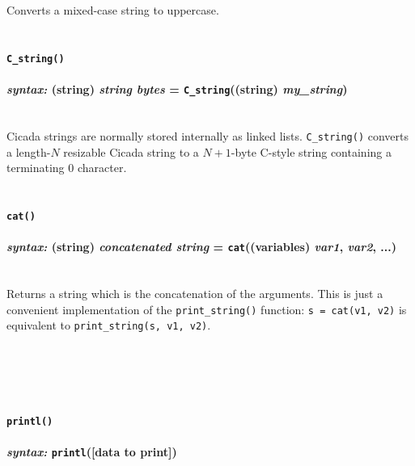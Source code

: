 \documentclass{article}
\begin{document}
Converts a mixed-case string to uppercase.\\\\


\paragraph{\texttt{C\_string()}\\\\
\normalfont \emph{syntax: } (string) \emph{string bytes} = \texttt{C\_string}((string) \emph{my\_string})\\\\}

Cicada strings are normally stored internally as linked lists.  \verb#C_string()# converts a length-$N$ resizable Cicada string to a $N+1$-byte C-style string containing a terminating 0 character.\\\\


\paragraph{\texttt{cat()}\\\\
\normalfont \emph{syntax: } (string) \emph{concatenated string} = \texttt{cat}((variables) \emph{var1}, \emph{var2}, ...)\\\\}

Returns a string which is the concatenation of the arguments.  This is just a convenient implementation of the \verb#print_string()# function:  \verb#s = cat(v1, v2)# is equivalent to \verb#print_string(s, v1, v2)#.\\\\\\\\



\\

\paragraph{\texttt{printl()}\\\\
\normalfont \emph{syntax: } \texttt{printl}([data to print])\\\\}
\end{document}
